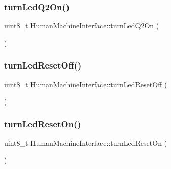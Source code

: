 \hypertarget{class_human_machine_interface_a9fcfd97db711e6954cbfeec8f93efb58}{}\label{class_human_machine_interface_a9fcfd97db711e6954cbfeec8f93efb58} 
\subsubsection{\texorpdfstring{turn\+Led\+Q2\+On()}{turnLedQ2On()}}
{\footnotesize\ttfamily uint8\+\_\+t Human\+Machine\+Interface\+::turn\+Led\+Q2\+On (\begin{DoxyParamCaption}{ }\end{DoxyParamCaption})}

\hypertarget{class_human_machine_interface_a446ad469f8c9f2717d12cc69ea68598f}{}\label{class_human_machine_interface_a446ad469f8c9f2717d12cc69ea68598f} 
\subsubsection{\texorpdfstring{turn\+Led\+Reset\+Off()}{turnLedResetOff()}}
{\footnotesize\ttfamily uint8\+\_\+t Human\+Machine\+Interface\+::turn\+Led\+Reset\+Off (\begin{DoxyParamCaption}{ }\end{DoxyParamCaption})}

\hypertarget{class_human_machine_interface_aecc34d7d1e3edbe2ed38e3808da65455}{}\label{class_human_machine_interface_aecc34d7d1e3edbe2ed38e3808da65455} 
\subsubsection{\texorpdfstring{turn\+Led\+Reset\+On()}{turnLedResetOn()}}
{\footnotesize\ttfamily uint8\+\_\+t Human\+Machine\+Interface\+::turn\+Led\+Reset\+On (\begin{DoxyParamCaption}{ }\end{DoxyParamCaption})}

\hypertarget{class_human_machine_interface_a235557e9ae72f14a4db72bab675eaae1}{}\label{class_human_machine_interface_a235557e9ae72f14a4db72bab675eaae1} 
